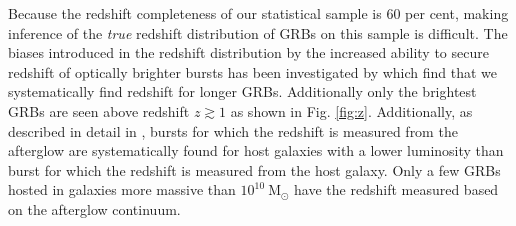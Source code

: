 \documentclass{aa}    %
\newcommand\todo[1]{\textbf{(#1)}}
\begin{document}
%

Because the redshift completeness of our statistical sample is 60 per cent,
making inference of the \textit{true} redshift distribution of GRBs on this
sample is difficult. The biases introduced in the redshift distribution by the
increased ability to secure redshift of optically brighter bursts has been
investigated by \citet{Turpin2016} which find that we systematically find
redshift for longer GRBs. Additionally only the brightest GRBs are seen above
redshift $z \gtrsim 1$ as shown in Fig. \ref{fig:z}. Additionally, as described
in detail in \citet{Perley2016b}, bursts for which the redshift is measured from
the afterglow are systematically found for host galaxies with a lower luminosity
than burst for which the redshift is measured from the host galaxy. Only a few
GRBs hosted in galaxies more massive than $10^{10}~\mathrm{M}_\odot$ have the
redshift measured based on the afterglow continuum.
\end{document}
